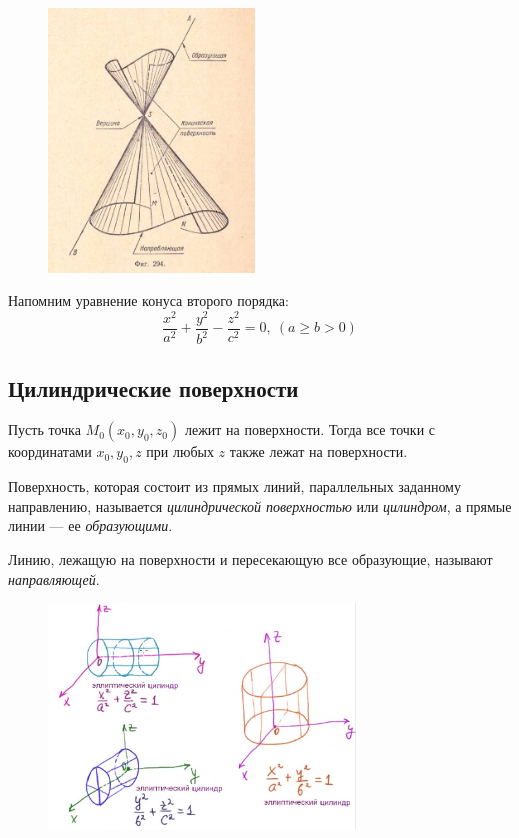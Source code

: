 \begin{figure}[H]
  \centering
  \includegraphics[height = 7cm]{images/second_conical.jpg}
\end{figure}

Напомним уравнение конуса второго порядка: 
$$
  \frac{x^2}{a^2} + \frac{y^2}{b^2} - \frac{z^2}{c^2} = 0, ~ (a \geq b > 0)
$$

\subsection*{Цилиндрические поверхности}

Пусть точка $M_0(x_0, y_0, z_0)$
лежит на поверхности. Тогда все точки с координатами
$x_0, y_0, z$ при любых $z$ также
лежат на поверхности. 
\begin{definition}
  Поверхность, которая состоит из прямых линий, параллельных заданному направлению, называется \textit{цилиндрической поверхностью} или \textit{цилиндром}, а прямые линии — ее \textit{образующими}.
  
  Линию, лежащую на поверхности и пересекающую все образующие, называют \textit{направляющей}.
\end{definition}

\begin{figure}[H]
  \centering
  \includegraphics[height = 6cm]{images/second_cylinder_surface.jpg}
\end{figure}

